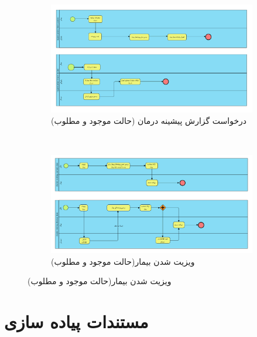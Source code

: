 \documentclass[a4paper,12pt]{report}
\begin{document}
	\pagebreak
	\begin{figure}[!h]
		\label{fig2:sec7}
		\begin{center}
			\begin{subfigure}[t]{\textwidth}
				\includegraphics[width=\linewidth]{requestPatientHistory.pdf}
				\caption{درخواست گزارش پیشینه درمان (حالت موجود و مطلوب)}
				\label{subfig3:fig1:sec7}
			\end{subfigure}	\\
			\begin{subfigure}[t]{\textwidth}
				\includegraphics[width=\textwidth]{visiting.pdf}
				\caption{ویزیت شدن بیمار(حالت موجود و مطلوب)}
				\label{subfig4:fig1:sec7}
			\end{subfigure}	
		\end{center}
	\end{figure}

	\pagebreak
	\chapter{
	مستندات پیاده سازی}
	\pagebreak
\end{document}
